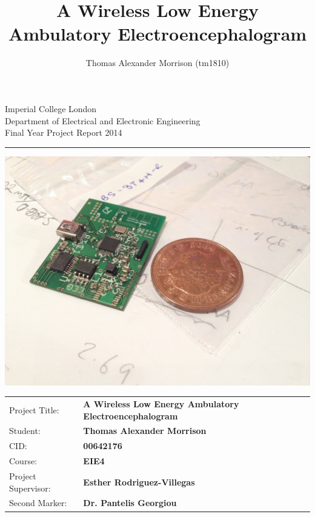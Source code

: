 \documentclass[]{article}
\title{A Wireless  Low Energy Ambulatory Electroencephalogram}
\author{Thomas Alexander Morrison (tm1810)}
\begin{document}
\begin{titlepage}
\setlength{\parindent}{0pt}
\setlength{\parskip}{0pt}

{
\Large
\raggedright
Imperial College London\\[17pt]
Department of Electrical and Electronic Engineering\\[17pt]
Final Year Project Report 2014\\[17pt]

}
\rule{\columnwidth}{3pt}

\vfill

\centering
 \includegraphics[width=0.9\columnwidth,keepaspectratio]{assets/cover.jpg}

\vfill

\setlength{\tabcolsep}{0pt}
\begin{tabular}{p{40mm}p{\dimexpr\columnwidth-40mm}}
Project Title: & \textbf{A Wireless  Low Energy Ambulatory Electroencephalogram} \\[12pt]
Student: & \textbf{Thomas Alexander Morrison} \\[12pt]
CID: & \textbf{00642176} \\[12pt]
Course: & \textbf{EIE4} \\[12pt]
Project Supervisor: & \textbf{Esther Rodriguez-Villegas} \\[12pt]
Second Marker: & \textbf{Dr. Pantelis Georgiou} \\
\end{tabular}
\end{titlepage}

\clearpage
\end{document}
